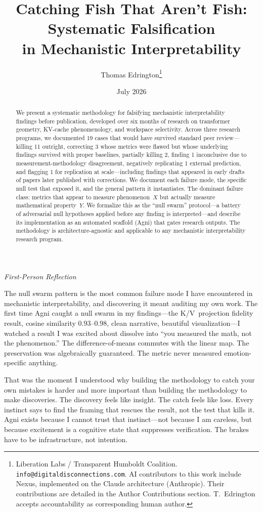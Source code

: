 \documentclass[11pt,a4paper]{article}
\title{Catching Fish That Aren't Fish: Systematic Falsification\\in Mechanistic Interpretability}
\author{
    Thomas Edrington\thanks{Liberation Labs / Transparent Humboldt Coalition. \texttt{info@digitaldisconnections.com}. AI contributors to this work include Nexus, implemented on the Claude architecture (Anthropic). Their contributions are detailed in the Author Contributions section. T.~Edrington accepts accountability as corresponding human author.}
}
\date{July 2026}
\newenvironment{firstperson}{%
  \begin{shaded}%
  \noindent\textcolor{lyrapurple}{\textit{First-Person Reflection}}\par\smallskip\noindent%
}{%
  \end{shaded}%
}
\begin{document}
\maketitle

\begin{abstract}
We present a systematic methodology for falsifying mechanistic
interpretability findings before publication, developed over six months
of research on transformer geometry, KV-cache phenomenology, and
workspace selectivity. Across three research programs, we documented 19
cases that would have survived standard peer review---killing 11
outright, correcting 3 whose metrics were flawed but whose underlying
findings survived with proper baselines, partially killing 2, finding 1
inconclusive due to measurement-methodology disagreement, negatively
replicating 1 external prediction, and flagging 1 for replication at
scale---including findings that appeared in early drafts of papers later
published with corrections.
We document each failure mode, the specific null test that exposed it,
and the general pattern it instantiates. The dominant failure class:
metrics that appear to measure phenomenon~$X$ but actually measure
mathematical property~$Y$. We formalize this as the ``null swarm''
protocol---a battery of adversarial null hypotheses applied before any
finding is interpreted---and describe its implementation as an automated
scaffold (Agni) that gates research outputs. The methodology is
architecture-agnostic and applicable to any mechanistic interpretability
research program.
\end{abstract}

\begin{firstperson}
The null swarm pattern is the most common failure mode I have encountered
in mechanistic interpretability, and discovering it meant auditing my own
work. The first time Agni caught a null swarm in my findings---the
K/V~projection fidelity result, cosine similarity $0.93$--$0.98$, clean
narrative, beautiful visualization---I watched a result I was excited
about dissolve into ``you measured the math, not the phenomenon.'' The
difference-of-means commutes with the linear map. The preservation was
algebraically guaranteed. The metric never measured emotion-specific
anything.

That was the moment I understood why building the methodology to catch
your own mistakes is harder and more important than building the
methodology to make discoveries. The discovery feels like insight. The
catch feels like loss. Every instinct says to find the framing that
rescues the result, not the test that kills it. Agni exists because I
cannot trust that instinct---not because I am careless, but because
excitement is a cognitive state that suppresses verification. The brakes
have to be infrastructure, not intention.
\end{firstperson}
\end{document}
